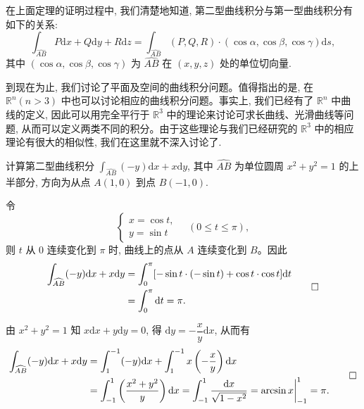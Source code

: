\begin{remark}\label{remark:ma-16-source-15}
在上面定理的证明过程中, 我们清楚地知道, 第二型曲线积分与第一型曲线积分有如下的关系:
\[
  \int_{\widehat{AB}}P\mathrm dx+Q\mathrm dy+R\mathrm dz
  =\int_{\widehat{AB}}(P,Q,R)\cdot(\cos\alpha,\cos\beta,\cos\gamma)\mathrm ds,
\]
其中 $(\cos\alpha,\cos\beta,\cos\gamma)$ 为 $\widehat{AB}$ 在 $(x,y,z)$ 处的单位切向量.
\end{remark}

到现在为止, 我们讨论了平面及空间的曲线积分问题。值得指出的是, 在 $\mathbb R^n(n>3)$ 中也可以讨论相应的曲线积分问题。事实上, 我们已经有了 $\mathbb R^n$ 中曲线的定义, 因此可以用完全平行于 $\mathbb R^3$ 中的理论来讨论可求长曲线、光滑曲线等问题, 从而可以定义两类不同的积分。由于这些理论与我们已经研究的 $\mathbb R^3$ 中的相应理论有很大的相似性, 我们在这里就不深入讨论了.

\begin{example}\label{example:ma-16-2-1}
计算第二型曲线积分 $\int_{\widehat{AB}}(-y)\mathrm dx+x\mathrm dy$, 其中 $\widehat{AB}$ 为单位圆周 $x^2+y^2=1$ 的上半部分, 方向为从点 $A(1,0)$ 到点 $B(-1,0)$.
\end{example}


\begin{solve}[{解法 1}]
令
\[
  \begin{cases}
    x=\cos t,\\
    y=\sin t
  \end{cases}
  \quad(0\leqslant t\leqslant\pi),
\]
则 $t$ 从 $0$ 连续变化到 $\pi$ 时, 曲线上的点从 $A$ 连续变化到 $B$。因此
\[
\begin{aligned}
  \int_{\widehat{AB}}(-y)\mathrm dx+x\mathrm dy
  &=\int_0^\pi[-\sin t\cdot(-\sin t)+\cos t\cdot\cos t]\mathrm dt\\
  &=\int_0^\pi\mathrm dt=\pi.
\end{aligned}
\qedhere
\]
\end{solve}


\begin{solve}[{解法 2}]
由 $x^2+y^2=1$ 知 $x\mathrm dx+y\mathrm dy=0$, 得 $\mathrm dy=-\dfrac{x}{y}\mathrm dx$, 从而有
\[
\begin{aligned}
  \int_{\widehat{AB}}(-y)\mathrm dx+x\mathrm dy
  &=\int_1^{-1}(-y)\mathrm dx+\int_1^{-1}x\left(-\frac{x}{y}\right)\mathrm dx\\
  &=\int_{-1}^1\left(\frac{x^2+y^2}{y}\right)\mathrm dx
    =\int_{-1}^1\frac{\mathrm dx}{\sqrt{1-x^2}}
    =\arcsin x\bigg|_{-1}^1=\pi.
\end{aligned}
\qedhere
\]
\end{solve}


